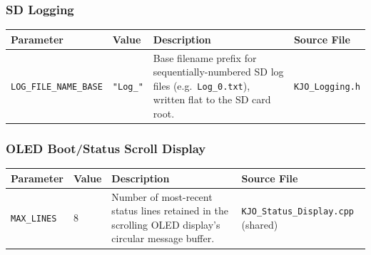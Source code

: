 ﻿\documentclass[11pt,letterpaper]{article}
\begin{document}
\subsubsection*{SD Logging}

\begingroup
\footnotesize
\begin{longtable}{@{}p{3.2cm}p{2.4cm}p{6.2cm}p{2.6cm}@{}}
\toprule
Parameter & Value & Description & Source File \\
\midrule
\texttt{LOG\_\allowbreak FILE\_\allowbreak NAME\_\allowbreak BASE} & \texttt{"Log\_\allowbreak "} & Base filename prefix for sequentially-numbered SD log files (e.g.\ \texttt{Log\_\allowbreak 0.txt}), written flat to the SD card root. & \texttt{KJO\_\allowbreak Logging.h} \\
\end{longtable}
\endgroup

\subsubsection*{OLED Boot/Status Scroll Display}

\begingroup
\footnotesize
\begin{longtable}{@{}p{3.2cm}p{2.4cm}p{6.2cm}p{2.6cm}@{}}
\toprule
Parameter & Value & Description & Source File \\
\midrule
\texttt{MAX\_\allowbreak LINES} & 8 & Number of most-recent status lines retained in the scrolling OLED display's circular message buffer. & \texttt{KJO\_\allowbreak Status\_\allowbreak Display.cpp} (shared) \\
\end{longtable}
\endgroup

\end{document}
